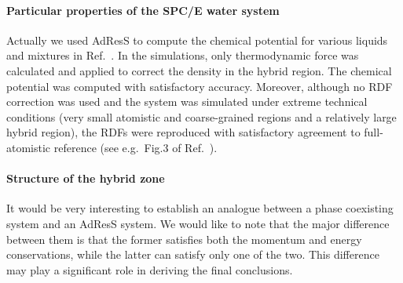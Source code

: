 \documentclass[epjST]{svjour}
\begin{document}
\paragraph{Particular properties of the SPC/E water system}
Actually we used AdResS to compute the chemical
potential for various liquids and mixtures in
Ref.~\cite{agarwal2014chemical}. In the simulations, only 
thermodynamic force was calculated and applied to correct the density
in the hybrid region. The chemical potential was computed with
satisfactory accuracy.  Moreover, although no RDF correction was used
and the system was simulated under extreme technical conditions (very
small atomistic and coarse-grained regions and a relatively large
hybrid region), the RDFs were reproduced with satisfactory
agreement to full-atomistic reference (see e.g.~Fig.3 of Ref.~\cite{agarwal2014chemical}).

\paragraph{Structure of the hybrid zone}
It would be very interesting to establish an analogue between
a phase coexisting system
and an AdResS system.
We would like to note that the major difference between them
is that the former satisfies both the momentum and energy
conservations, while the latter can satisfy only one of the two.
This difference may play a significant role in deriving the final conclusions.



{}


\end{document}
